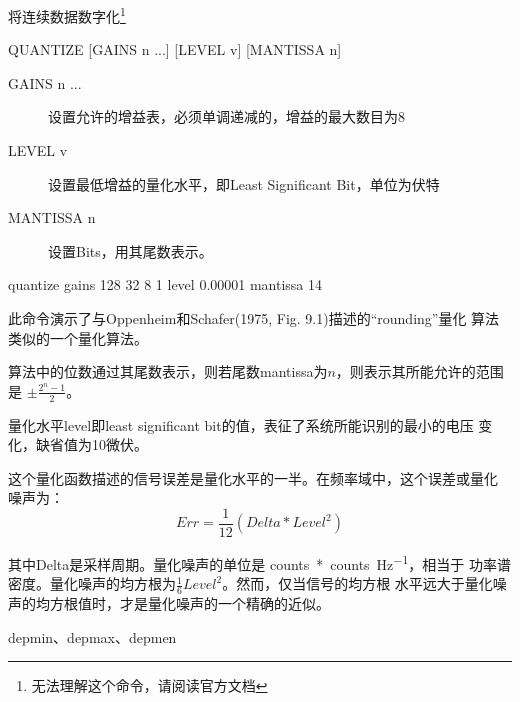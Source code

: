 \label{cmd:quantize}

将连续数据数字化\footnote{无法理解这个命令，请阅读官方文档}

\begin{SACSTX}
QUANTIZE [GAINS n ...] [LEVEL v] [MANTISSA n]
\end{SACSTX}

\begin{description}
\item [GAINS n ...] 设置允许的增益表，必须单调递减的，增益的最大数目为8
\item [LEVEL v] 设置最低增益的量化水平，即Least Significant Bit，单位为伏特
\item [MANTISSA n] 设置Bits，用其尾数表示。
\end{description}

\begin{SACDFT}
quantize gains 128 32 8 1 level 0.00001 mantissa 14
\end{SACDFT}

此命令演示了与Oppenheim和Schafer(1975, Fig. 9.1)描述的``rounding''量化
算法类似的一个量化算法。

算法中的位数通过其尾数表示，则若尾数mantissa为$n$，则表示其所能允许的范围是
$\pm \frac{2^n-1}{2}$。

量化水平level即least significant bit的值，表征了系统所能识别的最小的电压
变化，缺省值为10微伏。

这个量化函数描述的信号误差是量化水平的一半。在频率域中，这个误差或量化
噪声为：
\[
    Err = \frac{1}{12}(Delta*Level^2)
\]

其中Delta是采样周期。量化噪声的单位是 \si{counts*counts\per\Hz}，相当于
功率谱密度。量化噪声的均方根为$\frac{1}{6}Level^2$。然而，仅当信号的均方根
水平远大于量化噪声的均方根值时，才是量化噪声的一个精确的近似。

depmin、depmax、depmen
